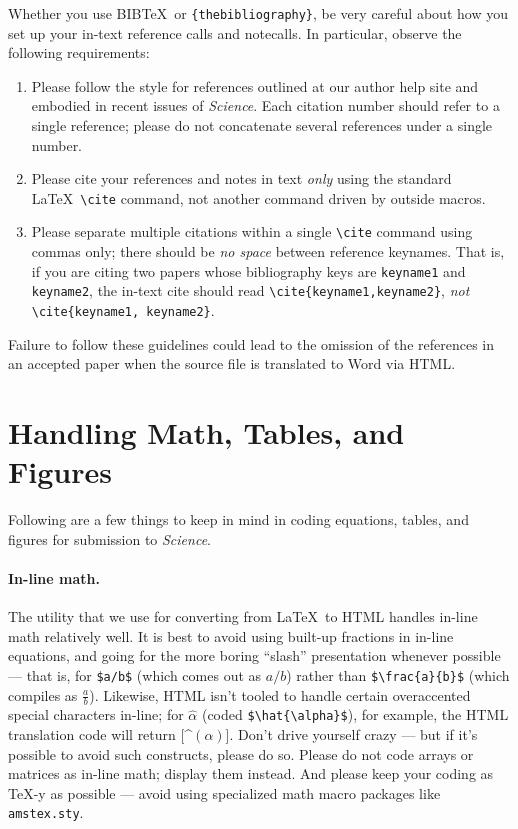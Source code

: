\documentclass[letterpaper, 12pt]{article}
\begin{document}
{Whether you use B{\small{IB}}\TeX\ or \texttt{\{thebibliography\}}, be
very careful about how you set up your in-text reference calls and
notecalls.  In particular, observe the following requirements:

\begin{enumerate}
\item Please follow the style for references outlined at our author
  help site and embodied in recent issues of {\it Science}.  Each
  citation number should refer to a single reference; please do not
  concatenate several references under a single number.
\item Please cite your references and notes in text {\it only\/} using
  the standard \LaTeX\ \verb+\cite+ command, not another command
  driven by outside macros.
\item Please separate multiple citations within a single \verb+\cite+
  command using commas only; there should be {\it no space\/}
  between reference keynames.  That is, if you are citing two
  papers whose bibliography keys are \texttt{keyname1} and
  \texttt{keyname2}, the in-text cite should read
  \verb+\cite{keyname1,keyname2}+, {\it not\/}
  \verb+\cite{keyname1, keyname2}+.
\end{enumerate}

\noindent Failure to follow these guidelines could lead
to the omission of the references in an accepted paper when the source
file is translated to Word via HTML.

\section*{Handling Math, Tables, and Figures}

Following are a few things to keep in mind in coding equations,
tables, and figures for submission to {\it Science}.

\paragraph*{In-line math.}  The utility that we use for converting
from \LaTeX\ to HTML handles in-line math relatively well.  It is best
to avoid using built-up fractions in in-line equations, and going for
the more boring ``slash'' presentation whenever possible --- that is,
for \verb+$a/b$+ (which comes out as $a/b$) rather than
\verb+$\frac{a}{b}$+ (which compiles as $\frac{a}{b}$).  Likewise,
HTML isn't tooled to handle certain overaccented special characters
in-line; for $\hat{\alpha}$ (coded \verb+$\hat{\alpha}$+), for
example, the HTML translation code will return [\^{}$(\alpha)$].
Don't drive yourself crazy --- but if it's possible to avoid such
constructs, please do so.  Please do not code arrays or matrices as
in-line math; display them instead.  And please keep your coding as
\TeX-y as possible --- avoid using specialized math macro packages
like \texttt{amstex.sty}.

}
\end{document}
